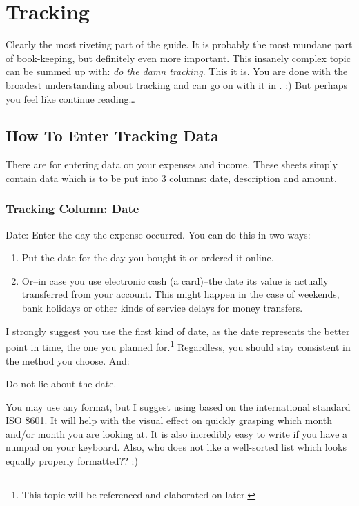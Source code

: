 \section{Tracking}
\label{sec:Tracking}

Clearly the most riveting part of the guide.
It is probably the most mundane part of book-keeping, but definitely even more important.
This insanely complex topic can be summed up with: \emph{do the damn tracking}.
This it is.
You are done with the broadest understanding about tracking and can go on with it in \tfn. :)
But perhaps you feel like continue reading\ldots

\subsection{How To Enter Tracking Data}
\label{subsec:enter-tracking-data}

There are  for entering data on your expenses and income.
These sheets simply contain data which is to be put into 3 columns: date, description and amount.

\subsubsection{Tracking Column: Date}
\label{subsec:tracking-column-date}

Date: Enter the day the expense occurred.
You can do this in two ways:
\begin{enumerate}
	\item Put the date for the day you bought it or ordered it online.
	\item Or--in case you use electronic cash (a card)--the date its value is actually transferred from your account.
	This might happen in the case of weekends, bank holidays or other kinds of service delays for money transfers.
\end{enumerate}
I strongly suggest you use the first kind of date, as the date represents the better point in time, \ie the one you planned for.\footnote{This topic will be referenced and elaborated on later.}
Regardless, you should stay consistent in the method you choose.
And:

\begin{center}
	Do not lie about the date.
\end{center}

You may use any format, but I suggest using  based on the international standard \href{https://en.wikipedia.org/wiki/ISO_8601}{ISO 8601}.
It will help with the visual effect on quickly grasping which month and/or month you are looking at.
It is also incredibly easy to write if you have a numpad on your keyboard.
Also, who does not like a well-sorted list which looks equally properly formatted?? :)

